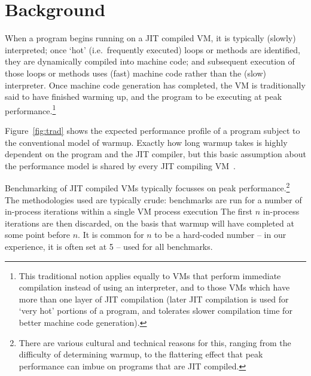 \documentclass[a4paper,UKenglish]{lipics}
\begin{document}
%


\section{Background}
\label{sec:warmup}

When a program begins running on a JIT compiled VM, it is typically (slowly)
interpreted; once `hot' (i.e.~frequently executed) loops or methods are
identified, they are dynamically compiled into machine code; and subsequent
execution of those loops or methods uses (fast) machine code rather than the
(slow) interpreter. Once machine code generation has completed, the VM is
traditionally said to have finished warming up, and the program to be executing
at peak performance.\footnote{This traditional notion applies equally to VMs
that perform immediate compilation instead of using an interpreter, and to
those VMs which have more than one layer of JIT compilation (later JIT
compilation is used for `very hot' portions of a program, and tolerates slower
compilation time for better machine code generation).}

Figure~\ref{fig:trad} shows the expected performance profile of a
program subject to the conventional model of warmup. Exactly how long warmup
takes is highly dependent on
the program and the JIT compiler, but this basic assumption about the
performance model is shared by every JIT compiling
VM~\cite{kalibera13rigorous}.

Benchmarking of JIT compiled VMs typically focusses on peak
performance.\footnote{There are various cultural and technical reasons for this,
ranging from the difficulty of determining warmup, to the flattering effect that
peak performance can imbue on programs that are JIT compiled.} The
methodologies used are typically crude: benchmarks are run for a number
of in-process iterations within a single VM process execution
The first $n$ in-process iterations are then discarded, on the basis that warmup
will have completed at some point before $n$. It is common for
$n$ to be a hard-coded number -- in our experience, it is often set at 5 -- used
for all benchmarks.
\end{document}
